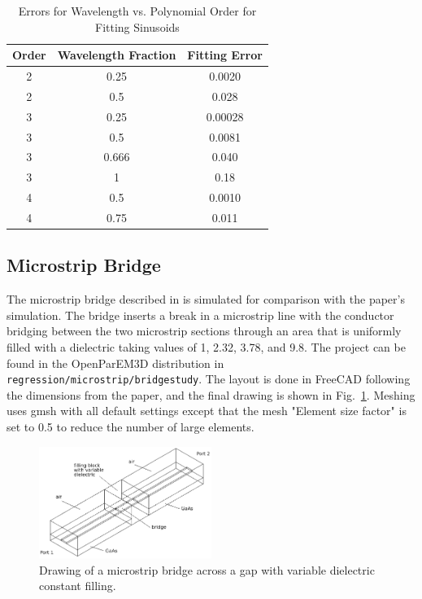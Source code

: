 \documentclass[titlepage]{article}
\renewcommand\_{\textunderscore\linebreak[1]}
\begin{document}
\begin{table}[H]
\caption{Errors for Wavelength vs. Polynomial Order for Fitting Sinusoids}
\begin{center}
\begin{tabular}{|c|c|c|}
\hline
Order & Wavelength Fraction & Fitting Error \\
\hline
2 & 0.25 & 0.0020 \\
2 & 0.5 & 0.028 \\
3 & 0.25 & 0.00028 \\
3 & 0.5 & 0.0081 \\
3 & 0.666 & 0.040 \\
3 & 1 & 0.18 \\
4 & 0.5 & 0.0010 \\
4 & 0.75 & 0.011 \\
\hline
\end{tabular}
\end{center}
\label{table:fitting_errors}
\end{table}
 

\subsection{Microstrip Bridge}

The microstrip bridge described in \cite{Wang} is simulated for comparison with the paper's simulation.  The bridge inserts a break in a microstrip line with the conductor bridging between the two microstrip sections through an area that is uniformly filled with a dielectric taking values of 1, 2.32, 3.78, and 9.8.  The project can be found in the OpenParEM3D distribution in \texttt{regression/microstrip/bridge\_study}.  The layout is done in FreeCAD following the dimensions from the paper, and the final drawing is shown in Fig.~\ref{fig:bridge_drawing}.  Meshing uses gmsh with all default settings except that the mesh "Element size factor" is set to 0.5 to reduce the number of large elements.

\begin{figure}[H]
  \centering
  \includegraphics[width=0.5\textwidth]{../regression/OpenParEM3D/microstrip/bridge_study/screenshots/bridge_drawing}
  \caption{Drawing of a microstrip bridge across a gap with variable dielectric constant filling.}
  \label{fig:bridge_drawing}
\end{figure}
\end{document}
